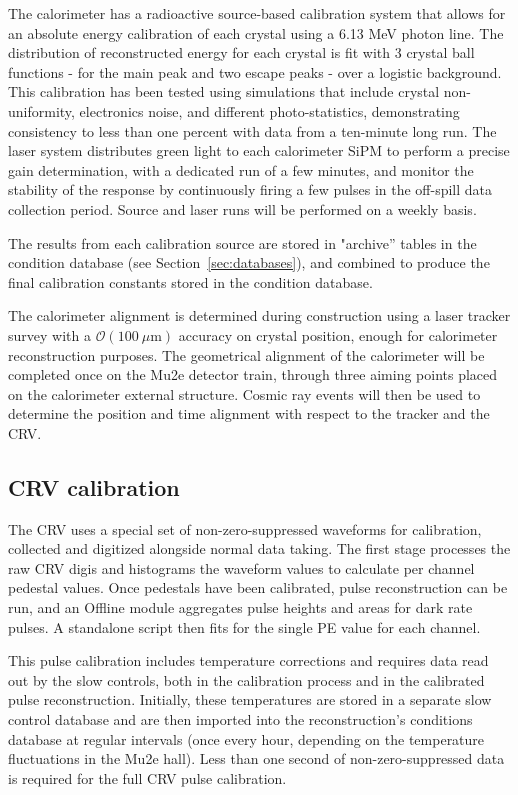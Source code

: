 The calorimeter has a radioactive source-based calibration system that allows for an absolute energy calibration of each crystal using a 6.13 MeV photon line. The distribution of reconstructed energy for each crystal is fit with 3 crystal ball functions - for the main peak and two escape peaks - over a logistic background. This calibration has been tested using simulations that include crystal non-uniformity, electronics noise, and different photo-statistics, demonstrating consistency to less than one percent with data from a ten-minute long run. The laser system distributes green light to each calorimeter SiPM to perform a precise gain determination, with a dedicated run of a few minutes, and monitor the stability of the response by continuously firing a few pulses in the off-spill data collection period. Source and laser runs will be performed on a weekly basis.

The results from each calibration source are stored in "archive'' tables in the condition database (see Section~\ref{sec:databases}), and combined to produce the final calibration constants stored in the condition database. 

The calorimeter alignment is determined during construction using a laser tracker survey with a $\mathcal{O}(100\ \mu \text{m})$ accuracy on crystal position, enough for calorimeter reconstruction purposes. The geometrical alignment of the calorimeter will be completed once on the Mu2e detector train, through three aiming points placed on the calorimeter external structure. Cosmic ray events will then be used to determine the position and time alignment with respect to the tracker and the CRV.

\subsection{CRV calibration}

The CRV uses a special set of non-zero-suppressed waveforms for calibration, collected and digitized alongside normal data taking. The first stage processes the raw CRV digis and histograms the waveform values to calculate per channel pedestal values. Once pedestals have been calibrated, pulse reconstruction can be run, and an Offline module aggregates pulse heights and areas for dark rate pulses. A standalone script then fits for the single PE value for each channel.

This pulse calibration includes temperature corrections and requires data read out by the slow controls, both in the calibration process and in the calibrated pulse reconstruction. Initially, these temperatures are stored in a separate slow control database and are then imported into the reconstruction's conditions database at regular intervals (once every hour, depending on the temperature fluctuations in the Mu2e hall). Less than one second of non-zero-suppressed data is required for the full CRV pulse calibration.


